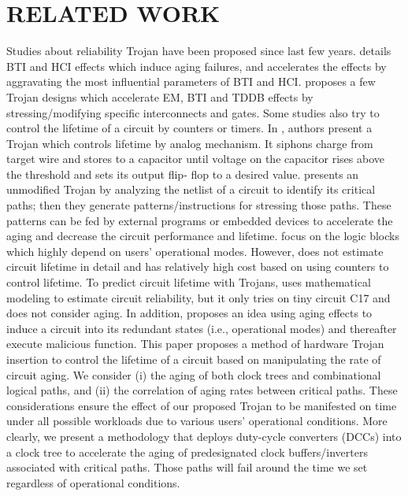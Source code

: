 \section{RELATED WORK}
\label{sec:related}
Studies about reliability Trojan have been proposed since last few years. \cite{shiyanovskii2010process} details BTI and HCI effects which induce aging failures, and accelerates the effects by aggravating the most influential parameters of BTI and HCI. \cite{sreedhar2012reliability} proposes a few Trojan designs which accelerate EM, BTI and TDDB effects by stressing/modifying specific interconnects and gates. Some studies also try to control the lifetime of a circuit by counters or timers. In \cite{yang2016a2}, authors present a Trojan which controls lifetime by analog mechanism. It siphons charge from target wire and stores to a capacitor until voltage on the capacitor rises above the threshold and sets its output flip- flop to a desired value.  \cite{karimi2015magic} presents an unmodified Trojan by analyzing the netlist of a circuit to identify its critical paths; then they generate patterns/instructions for stressing those paths. These patterns can be fed by external programs or embedded devices to accelerate the aging and decrease the circuit performance and lifetime. \cite{yang2016a2} \cite{karimi2015magic} focus on the logic blocks which highly depend on users' operational modes. However, \cite{shiyanovskii2010process} does not estimate circuit lifetime in detail and \cite{sreedhar2012reliability} has relatively high cost based on using counters to control lifetime. To predict circuit lifetime with Trojans, \cite{burman2012effect} uses mathematical modeling to estimate circuit reliability, but it only tries on tiny circuit C17 and does not consider aging. In addition, \cite{wei2013undetectable} proposes an idea using aging effects to induce a circuit into its redundant states (i.e., operational modes) and thereafter execute malicious function.
This paper proposes a method of hardware Trojan insertion to control the lifetime of a circuit based on manipulating the rate of circuit aging. We consider (i) the aging of both clock trees and combinational logical paths, and (ii) the correlation of aging rates between critical paths. These considerations ensure the effect of our proposed Trojan to be manifested on time under all possible workloads due to various users' operational conditions. More clearly, we present a methodology that deploys duty-cycle converters (DCCs) into a clock tree to accelerate the aging of predesignated clock buffers/inverters associated with critical paths. Those paths will fail around the time we set regardless of operational conditions.


